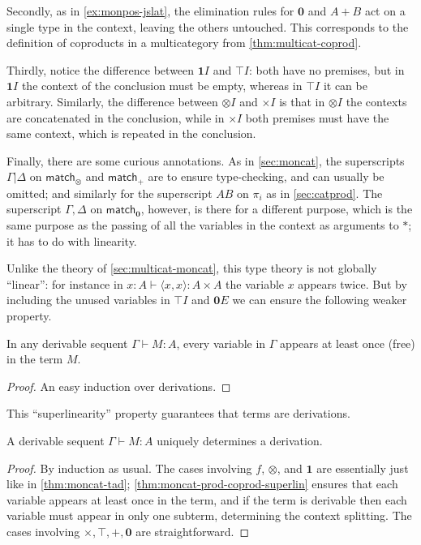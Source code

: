 \documentclass{book}
\let\types\vdash
\def\unit{\top}%
\def\ttt{\mathord{\ast}}%
\def\timesI{\ensuremath{\mathord{\times}I}}
\def\pair#1#2{\langle #1,#2\rangle}
\def\match{\mathsf{match}}
\def\zero{\mathbf{0}}
\def\abort{\match_{\zero}}
\def\one{\mathbf{1}}
\let\tensor\otimes
\def\tensorI{\mathord{\tensor}I}
\begin{document}
Secondly, as in \cref{ex:monpos-jslat}, the elimination rules for $\zero$ and $A+B$ act on a single type in the context, leaving the others untouched.
This corresponds to the definition of coproducts in a multicategory from \cref{thm:multicat-coprod}.

Thirdly, notice the difference between $\one I$ and $\unit I$: both have no premises, but in $\one I$ the context of the conclusion must be empty, whereas in $\unit I$ it can be arbitrary.
Similarly, the difference between $\tensorI$ and $\timesI$ is that in $\tensorI$ the contexts are concatenated in the conclusion, while in $\timesI$ both premises must have the same context, which is repeated in the conclusion.

Finally, there are some curious annotations.
As in \cref{sec:moncat}, the superscripts $\Gamma|\Delta$ on $\match_\tensor$ and $\match_+$ are to ensure type-checking, and can usually be omitted; and similarly for the superscript $AB$ on $\pi_i$ as in \cref{sec:catprod}.
The superscript $\Gamma,\Delta$ on $\abort$, however, is there for a different purpose, which is the same purpose as the passing of all the variables in the context as arguments to $\ttt$; it has to do with linearity.

Unlike the theory of \cref{sec:multicat-moncat}, this type theory is not globally ``linear'': for instance in $x:A \types \pair x x : A\times A$ the variable $x$ appears twice.
But by including the unused variables in $\unit I$ and $\zero E$ we can ensure the following weaker property.

\begin{lem}\label{thm:moncat-prod-coprod-superlin}
  In any derivable sequent $\Gamma\types M:A$, every variable in $\Gamma$ appears at least once (free) in the term $M$.
\end{lem}
\begin{proof}
  An easy induction over derivations.
\end{proof}

This ``superlinearity'' property guarantees that terms are derivations.

\begin{lem}\label{thm:moncat-prod-coprod-tad}
  A derivable sequent $\Gamma\types M:A$ uniquely determines a derivation.
\end{lem}
\begin{proof}
  By induction as usual.
  The cases involving $f$, $\tensor$, and $\one$ are essentially just like in \cref{thm:moncat-tad}; \cref{thm:moncat-prod-coprod-superlin} ensures that each variable appears at least once in the term, and if the term is derivable then each variable must appear in only one subterm, determining the context splitting.
  The cases involving $\times,\unit,+,\zero$ are straightforward.
\end{proof}
\end{document}

